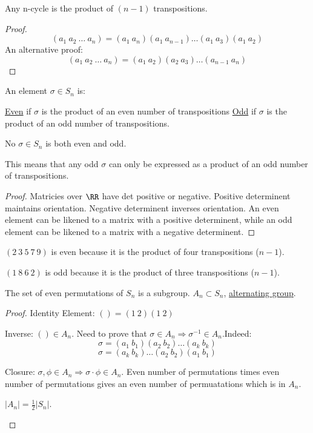 \documentclass[11pt]{scrartcl}
\begin{document}
\begin{theorem}
  Any n-cycle is the product of $(n - 1)$ transpositions.
  \begin{proof}

    $$(a_1 \ a_2 \ \dots \ a_n) = (a_1 \ a_n)(a_1 \ a_{n - 1})\dots(a_1 \ a_3)(a_1 \ a_2)$$
    An alternative proof:
    $$(a_1 \ a_2 \ \dots \ a_n) = (a_1 \ a_2)(a_2 \ a_3)\dots(a_{n - 1} \ a_n)$$
  \end{proof}
\end{theorem}

\begin{definition}
  An element $\sigma \in S_n$ is:
  \begin{enumerate}
    \ii
    \ul{Even} if $\sigma$ is the product of an even number of transpositions
    \ii
    \ul{Odd} if $\sigma$ is the product of an odd number of transpositions.
  \end{enumerate}
  \begin{theorem}
    No $\sigma \in S_n$ is both even and odd.
    \begin{note}
      This means that any odd $\sigma$ can only be expressed as a product of an odd number of transpositions.
    \end{note}
    \begin{proof}
      Matricies over $\RR$ have det positive or negative. Positive determinent maintains orientation. Negative determinent inverses orientation. An even element can be likened to a matrix with a positive determinent, while an odd element can be likened to a matrix with a negative determinent.
    \end{proof}
  \end{theorem}
\end{definition}

\begin{example}
  $(2 \ 3 \ 5 \ 7 \ 9)$ is even because it is the product of four transpositions ($n - 1$).

  $(1 \ 8 \ 6 \ 2)$ is odd because it is the product of three transpositions ($n - 1$).
\end{example}

\begin{theorem}
  The set of even permutations of $S_n$ is a subgroup. $A_n \subset S_n$, \ul{alternating group}.
\end{theorem}
\begin{proof}
  Identity Element: $() = (1 \ 2)(1 \ 2)$ 

  Inverse: $() \in A_n$. Need to prove that $\sigma \in A_n \Rightarrow \sigma^{-1} \in A_n$.Indeed:
  $$\sigma = (a_1 \ b_1)(a_2 \ b_2)\dots(a_k \ b_k)$$
  $$\sigma = (a_k \ b_k)\dots(a_2 \ b_2)(a_1 \ b_1)$$

  Closure: $\sigma, \phi \in A_n \Rightarrow \sigma \cdot \phi \in A_n$. Even number of permutations times even number of permutations gives an even number of permuatations which is in $A_n$.
  \begin{note}
    $|A_n| = \frac{1}{2}|S_n|$.
  \end{note}
\end{proof}
\end{document}
